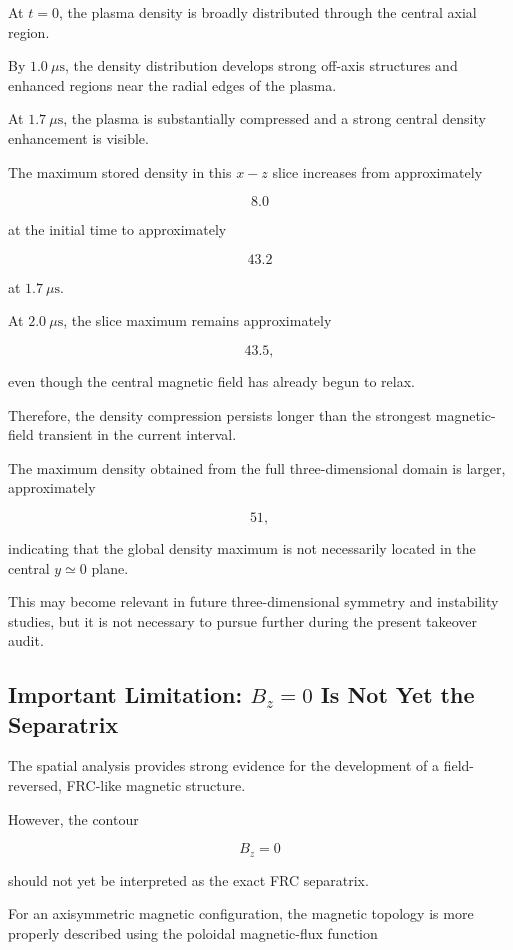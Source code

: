 \documentclass[11pt,a4paper]{article}
\begin{document}
At \(t=0\), the plasma density is broadly distributed through the central
axial region.

By \(1.0~\mu\mathrm{s}\), the density distribution develops strong
off-axis structures and enhanced regions near the radial edges of the plasma.

At \(1.7~\mu\mathrm{s}\), the plasma is substantially compressed and a strong
central density enhancement is visible.

The maximum stored density in this \(x-z\) slice increases from approximately

\[
8.0
\]

at the initial time to approximately

\[
43.2
\]

at \(1.7~\mu\mathrm{s}\).

At \(2.0~\mu\mathrm{s}\), the slice maximum remains approximately

\[
43.5,
\]

even though the central magnetic field has already begun to relax.

Therefore, the density compression persists longer than the strongest
magnetic-field transient in the current interval.

The maximum density obtained from the full three-dimensional domain is larger,
approximately

\[
51,
\]

indicating that the global density maximum is not necessarily located in the
central \(y\simeq0\) plane.

This may become relevant in future three-dimensional symmetry and instability
studies, but it is not necessary to pursue further during the present
takeover audit.


\subsection{Important Limitation: \(B_z=0\) Is Not Yet the Separatrix}

The spatial analysis provides strong evidence for the development of a
field-reversed, FRC-like magnetic structure.

However, the contour

\[
B_z=0
\]

should not yet be interpreted as the exact FRC separatrix.

For an axisymmetric magnetic configuration, the magnetic topology is more
properly described using the poloidal magnetic-flux function
\end{document}
